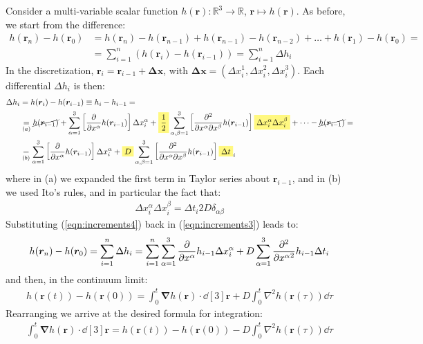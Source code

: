\documentclass[../template.tex]{subfiles}
\begin{document}
Consider a multi-variable scalar function $h(\bm{r}) \colon \mathbb{R}^3 \to \mathbb{R}$, $\bm{r} \mapsto h(\bm{r})$. As before, we start from the difference:
\begin{align} \nonumber
    h(\bm{r}_n) - h(\bm{r}_0) &= h(\bm{r}_n) - h(\bm{r}_{n-1}) + h(\bm{r}_{n-1}) -h(\bm{r}_{n-2}) + \dots + h(\bm{r}_1) - h(\bm{r}_0) =\\
    &= \sum_{i=1}^n (h(\bm{r}_i) - h(\bm{r}_{i-1})) = \sum_{i=1}^n \Delta h_i \label{eqn:increments3} 
\end{align}
In the discretization, $\bm{r}_i = \bm{r}_{i-1} + \bm{\Delta x}$, with $\bm{\Delta x} = (\Delta x_i^1, \Delta x_i^2, \Delta x_i^3)$. Each differential $\Delta h_i$ is then:
\begin{align}\nonumber
    \Delta h_i &= h(\bm{r}_i) - h(\bm{r}_{i-1}) \equiv h_i - h_{i-1} =\\
    \nonumber&\underset{(a)}{=} \cancel{h(\bm{r}_{i-1})} + \sum_{\alpha =1}^3 \left[\pdv{x^\alpha}h(\bm{r}_{i-1})\right] \Delta x_i^\alpha + \hlc{Yellow}{\frac{1}{2}} \sum_{\alpha, \beta = 1}^3 \left[\pdv[2]{}{x^\alpha}{x^\beta}h(\bm{r}_{i-1})\right] \hlc{Yellow}{\Delta x_i^\alpha \Delta x_i^\beta }+ \dots - \cancel{h(\bm{r}_{i-1})} =\\
    &\underset{(b)}{=}  \sum_{\alpha =1}^3 \left[\pdv{x^\alpha}h(\bm{r}_{i-1})\right] \Delta x_i^\alpha + \hlc{Yellow}{D} \sum_{\alpha, \beta = 1}^3 \left[\pdv[2]{}{x^\alpha}{x^\beta}h(\bm{r}_{i-1})\right] \hlc{Yellow}{\Delta t}_i 
    \label{eqn:increments4}
\end{align}
where in (a) we expanded the first term in Taylor series about $\bm{r}_{i-1}$, and in (b) we used Ito's rules, and in particular the fact that:
\begin{align*}
    \Delta x_i^\alpha \Delta x_i^\beta = \Delta t_i 2 D \delta_{\alpha \beta}
\end{align*}
Substituting (\ref{eqn:increments4}) back in (\ref{eqn:increments3}) leads to:
\begin{align*}
    h(\bm{r}_n) - h(\bm{r}_0) = \sum_{i=1}^n \Delta h_i = \sum_{i=1}^n\sum_{\alpha = 1}^3  \pdv{x^\alpha} h_{i-1} \Delta x_i^\alpha + D \sum_{\alpha =1}^3 \pdv[2]{{x^\alpha}} h_{i-1} \Delta t_i
 \end{align*}
 and then, in the continuum limit:
 \begin{align*}
     h(\bm{r}(t))- h(\bm{r}(0)) = \int_0^t \bm{\nabla} h(\bm{r}) \cdot \dd[3]{\bm{r}} + D \int_0^t \nabla^2 h(\bm{r}(\tau)) \dd{\tau}
 \end{align*}
 Rearranging we arrive at the desired formula for integration:
 \begin{align}
     \int_0^t \bm{\nabla} h(\bm{r}) \cdot \dd[3]{\bm{r}} = h(\bm{r}(t)) - h(\bm{r}(0)) - D\int_0^t \nabla^2 h(\bm{r}(\tau)) \dd{\tau}
     \label{eqn:multivariate-integration}
 \end{align}
\end{document}

